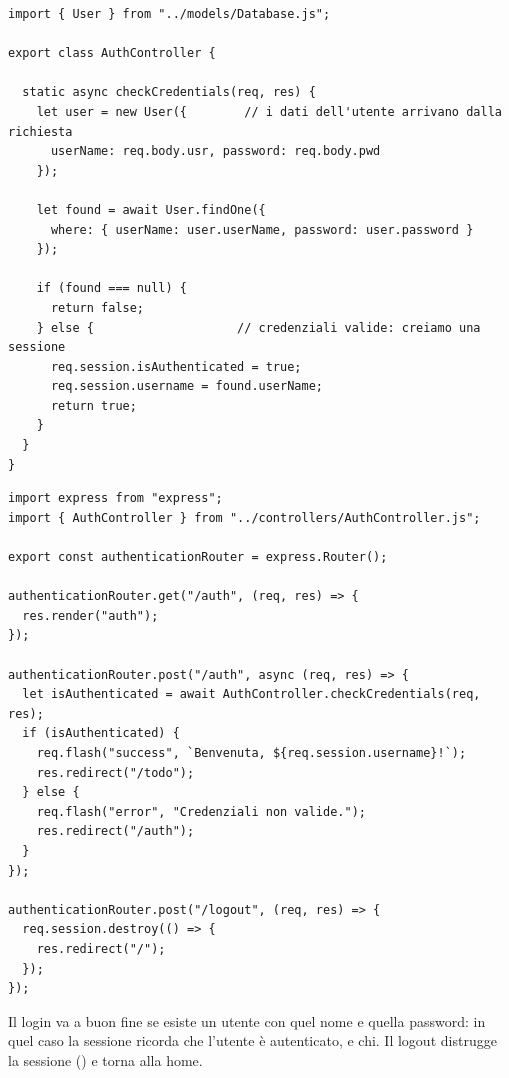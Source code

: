 \begin{lstlisting}[style=js, name=controllers/AuthController.js]
import { User } from "../models/Database.js";

export class AuthController {

  static async checkCredentials(req, res) {
    let user = new User({        // i dati dell'utente arrivano dalla richiesta
      userName: req.body.usr, password: req.body.pwd
    });

    let found = await User.findOne({
      where: { userName: user.userName, password: user.password }
    });

    if (found === null) {
      return false;
    } else {                    // credenziali valide: creiamo una sessione
      req.session.isAuthenticated = true;
      req.session.username = found.userName;
      return true;
    }
  }
}
\end{lstlisting}

\begin{lstlisting}[style=js, name=routes/authenticationRouter.js]
import express from "express";
import { AuthController } from "../controllers/AuthController.js";

export const authenticationRouter = express.Router();

authenticationRouter.get("/auth", (req, res) => {
  res.render("auth");
});

authenticationRouter.post("/auth", async (req, res) => {
  let isAuthenticated = await AuthController.checkCredentials(req, res);
  if (isAuthenticated) {
    req.flash("success", `Benvenuta, ${req.session.username}!`);
    res.redirect("/todo");
  } else {
    req.flash("error", "Credenziali non valide.");
    res.redirect("/auth");
  }
});

authenticationRouter.post("/logout", (req, res) => {
  req.session.destroy(() => {
    res.redirect("/");
  });
});
\end{lstlisting}

Il login va a buon fine se esiste un utente con quel nome e quella password: in
quel caso la sessione ricorda che l'utente è autenticato, e chi. Il logout
distrugge la sessione () e torna alla home.


